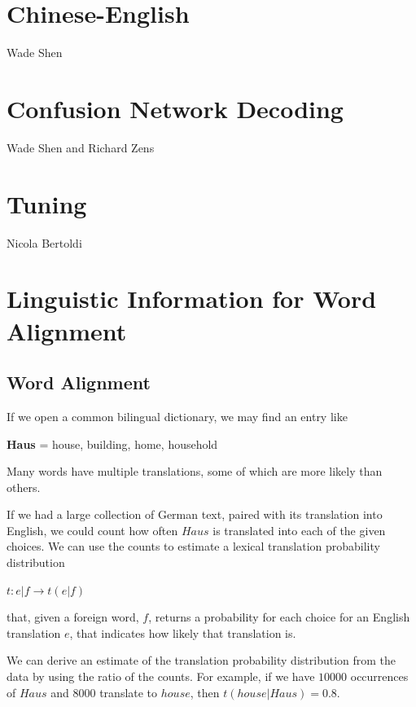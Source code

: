 \documentclass[10pt]{report}
\theoremstyle{plain}
\begin{document}
{{}  %


\section{Chinese-English}
{\sc Wade Shen}

\section{Confusion Network Decoding}
{\sc Wade Shen and Richard Zens}

\section{Tuning}
{\sc Nicola Bertoldi}

\section{Linguistic Information for Word Alignment}

\subsection{Word Alignment\\}

If we open a common bilingual dictionary, we may find an entry
like\\
\begin{center}
\textbf{Haus} = house, building, home, household\\
\end{center}
Many words have multiple translations, some of which are more likely
than others.

If we had a large collection of German text, paired with its
translation into English, we could count how often $Haus$ is
translated into each of the given choices. We can use the counts to
estimate a lexical translation probability distribution

\begin{center}
$t : e|f \rightarrow t(e|f)$
\end{center}

that, given a foreign word, $f$, returns a probability for each
choice for an English translation $e$, that indicates how likely
that translation is.


We can derive an estimate of the translation probability
distribution from the data by using the ratio of the counts. For
example, if we have $10000$ occurrences of $Haus$ and $8000$
translate to $house$, then $t(house|Haus)=0.8$.

}
\end{document}

